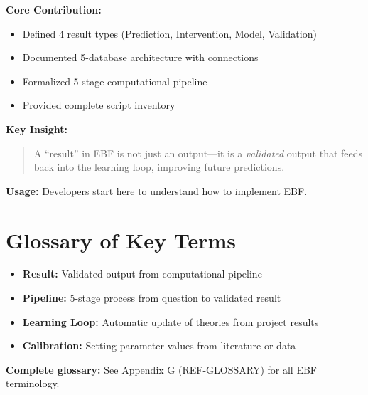 \begin{tcolorbox}[colback=blue!5!white, colframe=blue!75!black,
    title=\textbf{Appendix DP Summary}]

\textbf{Core Contribution:}
\begin{itemize}[nosep]
    \item Defined 4 result types (Prediction, Intervention, Model, Validation)
    \item Documented 5-database architecture with connections
    \item Formalized 5-stage computational pipeline
    \item Provided complete script inventory
\end{itemize}

\textbf{Key Insight:}
\begin{quote}
A ``result'' in EBF is not just an output---it is a \textit{validated} output
that feeds back into the learning loop, improving future predictions.
\end{quote}

\textbf{Usage:} Developers start here to understand how to implement EBF.

\end{tcolorbox}

\section{Glossary of Key Terms}
\label{sec:dp-glossary}

\begin{itemize}[nosep]
    \item \textbf{Result:} Validated output from computational pipeline
    \item \textbf{Pipeline:} 5-stage process from question to validated result
    \item \textbf{Learning Loop:} Automatic update of theories from project results
    \item \textbf{Calibration:} Setting parameter values from literature or data
\end{itemize}

\medskip
\textbf{Complete glossary:} See Appendix G (REF-GLOSSARY) for all EBF terminology.


